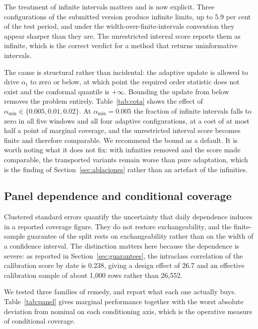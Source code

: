 \documentclass[preprint,3p,times]{elsarticle}
\begin{document}
The treatment of infinite intervals matters and is now explicit. Three configurations of the submitted version produce infinite limits, up to 5.9 per cent of the test period, and under the width-over-finite-intervals convention they appear sharper than they are. The unrestricted interval score reports them as infinite, which is the correct verdict for a method that returns uninformative intervals.

The cause is structural rather than incidental: the adaptive update is allowed to drive $\alpha_t$ to zero or below, at which point the required order statistic does not exist and the conformal quantile is $+\infty$. Bounding the update from below removes the problem entirely. Table~\ref{tab:cota} shows the effect of $\alpha_{\min}\in\{0.005,0.01,0.02\}$. At $\alpha_{\min}=0.005$ the fraction of infinite intervals falls to zero in all five windows and all four adaptive configurations, at a cost of at most half a point of marginal coverage, and the unrestricted interval score becomes finite and therefore comparable. We recommend the bound as a default. It is worth noting what it does not fix: with infinities removed and the score made comparable, the transported variants remain worse than pure adaptation, which is the finding of Section~\ref{sec:ablaciones} rather than an artefact of the infinities.



\subsection{Panel dependence and conditional coverage}
\label{sec:panel}

Clustered standard errors quantify the uncertainty that daily dependence induces in a reported coverage figure. They do not restore exchangeability, and the finite-sample guarantee of the split rests on exchangeability rather than on the width of a confidence interval. The distinction matters here because the dependence is severe: as reported in Section~\ref{sec:guarantees}, the intraclass correlation of the calibration score by date is 0.238, giving a design effect of 26.7 and an effective calibration sample of about 1{,}000 rows rather than 26{,}552.

We tested three families of remedy, and report what each one actually buys. Table~\ref{tab:panel} gives marginal performance together with the worst absolute deviation from nominal on each conditioning axis, which is the operative measure of conditional coverage.
\end{document}
